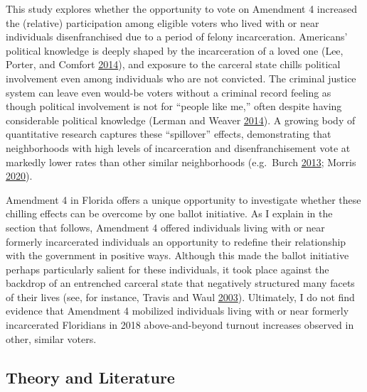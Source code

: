 \documentclass[
  12pt,
]{article}
\begin{document}
This study explores whether the opportunity to vote on Amendment 4 increased the (relative) participation among eligible voters who lived with or near individuals disenfranchised due to a period of felony incarceration. Americans' political knowledge is deeply shaped by the incarceration of a loved one (Lee, Porter, and Comfort \protect\hyperlink{ref-Lee2014}{2014}), and exposure to the carceral state chills political involvement even among individuals who are not convicted. The criminal justice system can leave even would-be voters without a criminal record feeling as though political involvement is not for ``people like me,'' often despite having considerable political knowledge (Lerman and Weaver \protect\hyperlink{ref-Lerman2014}{2014}). A growing body of quantitative research captures these ``spillover'' effects, demonstrating that neighborhoods with high levels of incarceration and disenfranchisement vote at markedly lower rates than other similar neighborhoods (e.g.~Burch \protect\hyperlink{ref-Burch2013}{2013}; Morris \protect\hyperlink{ref-Morris2020}{2020}).

Amendment 4 in Florida offers a unique opportunity to investigate whether these chilling effects can be overcome by one ballot initiative. As I explain in the section that follows, Amendment 4 offered individuals living with or near formerly incarcerated individuals an opportunity to redefine their relationship with the government in positive ways. Although this made the ballot initiative perhaps particularly salient for these individuals, it took place against the backdrop of an entrenched carceral state that negatively structured many facets of their lives (see, for instance, Travis and Waul \protect\hyperlink{ref-Travis2003}{2003}). Ultimately, I do not find evidence that Amendment 4 mobilized individuals living with or near formerly incarcerated Floridians in 2018 above-and-beyond turnout increases observed in other, similar voters.

\hypertarget{theory-and-literature}{%
\subsection*{Theory and Literature}\label{theory-and-literature}}
\end{document}
